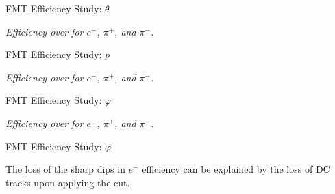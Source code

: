\begin{frame}{FMT Efficiency Study: $\theta$}
    \begin{center}
        \vspace{-6pt}
        \begin{figure}[t]
        \end{figure}
        \scriptsize{\textit{Efficiency over \ef{$\theta$} for $e^-$, $\pi^+$, and $\pi^-$.}}
    \end{center}

\end{frame}

\begin{frame}{FMT Efficiency Study: $p$}
    \begin{center}
        \vspace{-6pt}
        \begin{figure}[t]
        \end{figure}
        \scriptsize{\textit{Efficiency over  for $e^-$, $\pi^+$, and $\pi^-$.}}
    \end{center}

\end{frame}

\begin{frame}{FMT Efficiency Study: $\varphi$}
    \begin{center}
        \vspace{-6pt}
        \begin{figure}[t]
        \end{figure}
        \scriptsize{\textit{Efficiency over \ef{$\varphi$} for $e^-$, $\pi^+$, and $\pi^-$.}}
    \end{center}

\end{frame}

\begin{frame}{FMT Efficiency Study: $\varphi$}
    \label{20.10::fmt_efficiency_study_end}

    The loss of the sharp dips in $e^-$ \ef{$\varphi$} efficiency can be explained by the loss of DC tracks upon applying the cut.

    \begin{center}
        \begin{figure}[t]
        \end{figure}
    \end{center}

\end{frame}
